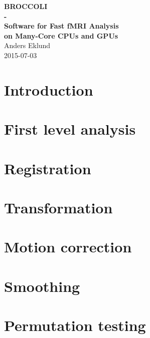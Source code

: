 \documentclass[11pt,a4paper]{book}
\makeatletter
\def\cleardoublepage{\clearpage\if@twoside \ifodd\c@page\else
\hbox{}
\thispagestyle{empty}     
\newpage 
\if@twocolumn\hbox{}\newpage\fi\fi\fi}
\makeatother
\begin{document}



\thispagestyle{empty}
\makeatletter
\begin{center}
  {\huge \textbf{BROCCOLI \\ - \\ Software for Fast fMRI Analysis \\ on Many-Core CPUs and GPUs}}\\[1 cm]
  {\Large Anders Eklund}\\[1.5 cm]
  {\Large 2015-07-03}\\[1.5 cm]
\end{center}


\renewcommand{\contentsname}{Table of Contents}
\tableofcontents



%


\chapter{Introduction}
\label{sec:intro}


\cleardoublepage
\newpage
\chapter{First level analysis}
\label{sec:firstlevel}


\cleardoublepage
\newpage
\chapter{Registration}
\label{sec:registration}


\cleardoublepage
\newpage
\chapter{Transformation}
\label{sec:transformation}


\cleardoublepage
\newpage
\chapter{Motion correction}
\label{sec:motion}


\cleardoublepage
\newpage
\chapter{Smoothing}
\label{sec:smoothing}


\cleardoublepage
\newpage
\chapter{Permutation testing}
\label{sec:randomise}





\cleardoublepage
\end{document}

